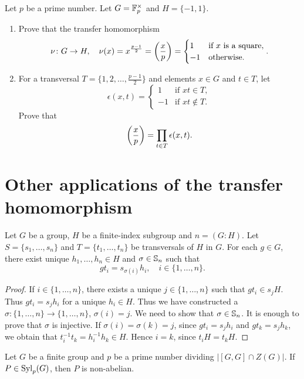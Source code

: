 \begin{exercise}
	Let $p$ be a prime number. Let $G=\mathbb{F}_p^\times$ and $H=\{-1,1\}$. 
    \begin{enumerate} 
    \item Prove that the transfer homomorphism 
	\[
		\nu\colon G\to H,\quad
		\nu(x)=x^{\frac{p-1}{2}}=\left(\frac{x}{p}\right)=\begin{cases}
			1 & \text{if $x$ is a square},\\
			-1 & \text{otherwise}.
		\end{cases}.
	\]
	\item For a transversal $T=\{1,2,\dots,\frac{p-1}{2}\}$ and elements $x\in G$ and $t\in T$, let 
 	\[
	\epsilon(x,t)=\begin{cases}
		1 & \text{if $xt\in T$},\\
		-1 & \text{if $xt\not\in T$}.
	\end{cases}
	\]
	Prove that  
	\[
	\left(\frac{x}{p}\right)=\prod_{t\in T}\epsilon(x,t).
	\]
    \end{enumerate}
\end{exercise}

\section{Other applications of the transfer homomorphism}

\begin{lemma}
	\label{lem:sigma}
	Let $G$ be a group, $H$ be a finite-index subgroup and $n=(G:H)$. 
    Let $S=\{s_1,\dots,s_n\}$ and $T=\{t_1,\dots,t_n\}$ be transversals of $H$ in $G$. 
    For each $g\in G$, there exist unique $h_1,\dots,h_n\in H$ and 
	$\sigma\in\mathbb{S}_n$ such that 
	\[
		gt_i=s_{\sigma(i)}h_i,\quad
		i\in\{1,\dots,n\}.
	\]
\end{lemma}

\begin{proof}
	If $i\in\{1,\dots,n\}$, there exists  a unique $j\in\{1,\dots,n\}$ such that 
    $gt_i\in
	s_jH$. Thus $gt_i=s_jh_i$ for a unique $h_i\in H$. Thus we have constructed a 
	$\sigma\colon\{1,\dots,n\}\to\{1,\dots,n\}$, $\sigma(i)=j$.  We need to show that 
	$\sigma\in\mathbb{S}_n$. It is enough to prove that $\sigma$ is injective. If
	$\sigma(i)=\sigma(k)=j$, since $gt_i=s_jh_i$ and $gt_k=s_jh_k$, we obtain that 
	$t_i^{-1}t_k=h_i^{-1}h_k\in H$. Hence $i=k$, since $t_iH=t_kH$.
\end{proof}


\begin{theorem}
	\label{thm:P_nonabelian}
	Let $G$ be a finite group and $p$ be a prime number dividing $|[G,G]\cap
	Z(G)|$. If $P\in\mathrm{Syl}_p(G)$, then $P$ is non-abelian. 
\end{theorem}

